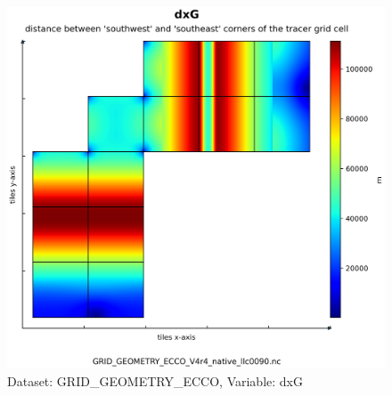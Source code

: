 \begin{figure}[H]
\centering
\includegraphics[scale=0.55]{../images/plots/native_plots_coords/Geometry_Parameters_for_the_Lat-Lon-Cap_90_(llc90)_Native_Model_Grid_(Version_4_Release_4)/dxG.png}
\caption{Dataset: GRID\_GEOMETRY\_ECCO, Variable: dxG}
\label{tab:table-GRID_GEOMETRY_ECCO_dxG-Plot}
\end{figure}
\pagebreak

